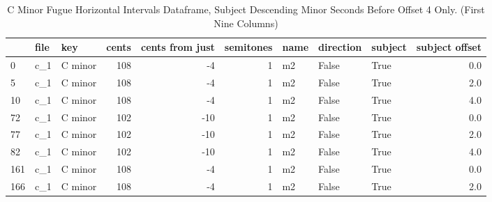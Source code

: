 \begin{singlespace}
\begin{table}[H]
\centering
\tiny
\begin{tabular}{|lllrrrlllr|}
\hline
\textbf{{}} & \textbf{file} & \textbf{     key} & \textbf{ cents} & \textbf{ cents from just} & \textbf{ semitones} & \textbf{name} & \textbf{direction} & \textbf{subject} & \textbf{ subject offset }\\
\hline
0   &  c\_1 &  C minor &    108 &               -4 &          1 &   m2 &     False &    True &             0.0 \\
5   &  c\_1 &  C minor &    108 &               -4 &          1 &   m2 &     False &    True &             2.0 \\
10  &  c\_1 &  C minor &    108 &               -4 &          1 &   m2 &     False &    True &             4.0 \\
72  &  c\_1 &  C minor &    102 &              -10 &          1 &   m2 &     False &    True &             0.0 \\
77  &  c\_1 &  C minor &    102 &              -10 &          1 &   m2 &     False &    True &             2.0 \\
82  &  c\_1 &  C minor &    102 &              -10 &          1 &   m2 &     False &    True &             4.0 \\
161 &  c\_1 &  C minor &    108 &               -4 &          1 &   m2 &     False &    True &             0.0 \\
166 &  c\_1 &  C minor &    108 &               -4 &          1 &   m2 &     False &    True &             2.0 \\
\hline
\end{tabular}
\caption[C minor Fugue Horizontal Intervals Dataframe, Subject Descending Minor Seconds Before Offset 4 Only. ]{C Minor Fugue Horizontal Intervals Dataframe, Subject Descending Minor Seconds Before Offset 4 Only. (First Nine Columns)}
\end{table}
\normalsize
\end{singlespace}






